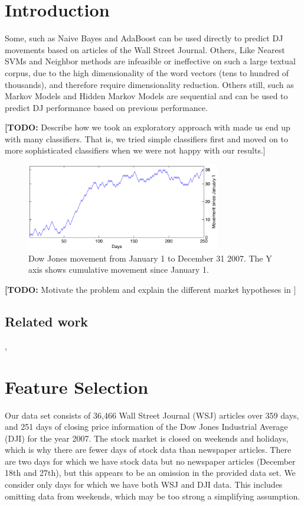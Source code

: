 \documentclass[10pt, twocolumn]{article}
\def\TODO#1{\noindent\textbf{[TODO:} #1]}
\begin{document}
\section{Introduction}

Some, such as Naive Bayes and AdaBoost can be used directly to predict DJ movements based on articles of the Wall Street Journal. Others, Like Nearest  SVMs and Neighbor methods are infeasible or ineffective on such a large textual corpus, due to the high dimensionality of the word vectors (tens to hundred of thousands), and therefore require dimensionality reduction.
Others still, such as Markov Models and Hidden Markov Models are sequential and can be used to predict DJ performance based on previous performance.


\TODO{Describe how we took an exploratory approach with made us end up with many classifiers. That is, we tried simple classifiers first and moved on to more sophisticated classifiers when we were not happy with our results.}

\begin{figure}
\includegraphics[width=8.5cm]{experiments/dj_performance.pdf}
\caption{Dow Jones movement from January 1 to December 31 2007. The Y axis shows cumulative movement since January 1.}
\label{fig:dj-preformance}
\end{figure}

\TODO{Motivate the problem and explain the different market hypotheses in \cite{mlstockmarket}}

\subsection{Related work}
\cite{twitter}, \cite{mlstockmarket}

\section{Feature Selection}
\label{sec:features}

Our data set consists of 36,466 Wall Street Journal (WSJ) articles over 359 days, and 251 days of closing price information of the Dow Jones Industrial Average (DJI) for the year 2007. The stock market is closed on weekends and holidays, which is why there are fewer days of stock data than newspaper articles. There are two days for which we have stock data but no newspaper articles (December 18th and 27th), but this appears to be an omission in the provided data set. We consider only days for which we have both WSJ and DJI data. This includes omitting data from weekends, which may be too strong a simplifying assumption.
\end{document}
